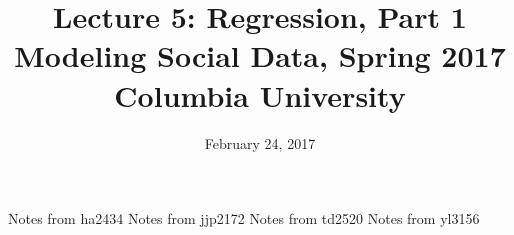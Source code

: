 \documentclass{article}
\title{
Lecture 5: Regression, Part 1 \\  %
Modeling Social Data, Spring 2017 \\   %
Columbia University                    %
}
\date{February 24, 2017}                %
\makeatletter
\let\org@subfile
\renewcommand*{}[1]{%
  \filename@parse{#1}%
  \expandafter
  \graphicspath\expandafter{\expandafter{\filename@area}}%
  \org@subfile{#1}%
}
\makeatother
\begin{document}
\maketitle


\pagebreak \newpage \noindent\Huge{Notes from ha2434} \normalsize \setcounter{section}{0} 
\pagebreak \newpage \noindent\Huge{Notes from jjp2172} \normalsize \setcounter{section}{0} 
\pagebreak \newpage \noindent\Huge{Notes from td2520} \normalsize \setcounter{section}{0} 
\pagebreak \newpage \noindent\Huge{Notes from yl3156} \normalsize \setcounter{section}{0} 
\end{document}
